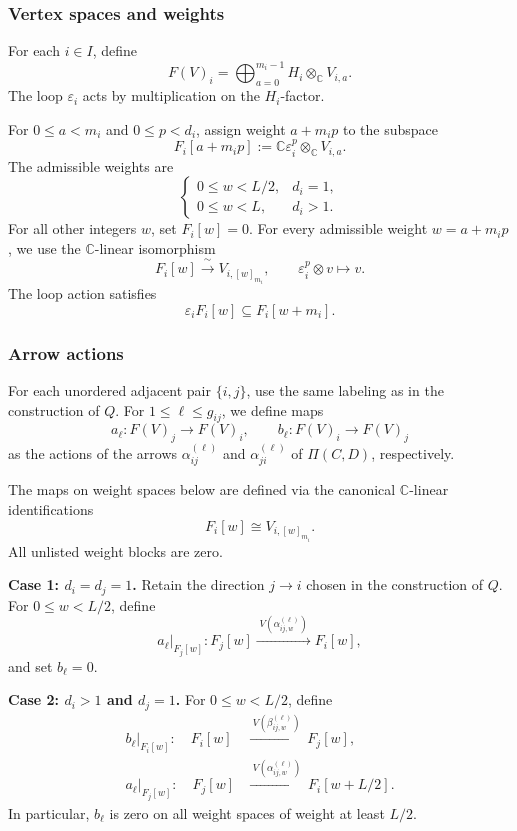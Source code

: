 \documentclass[12pt,reqno]{amsart}
\numberwithin{equation}{section}
\theoremstyle{definition}
\theoremstyle{remark}
\theoremstyle{plain}
\theoremstyle{plain}
\begin{document}
\subsubsection{Vertex spaces and weights}
For each $i\in I$, define
\begin{equation}\label{eq:inj-testvertices}
F(V)_i
=
\bigoplus_{a=0}^{m_i-1}
H_i\otimes_{\mathbb C}V_{i,a}.
\end{equation}
The loop $\varepsilon_i$ acts by multiplication
on the $H_i$-factor.

For $0\le a<m_i$ and $0\le p<d_i$, assign weight $a+m_ip$ to the subspace
\[
    F_i[a+m_ip]
    :=
    \mathbb C\varepsilon_i^p
    \otimes_{\mathbb C}V_{i,a}.
\]
The admissible weights are
\[
    \begin{cases}
        0\le w<L/2, & d_i=1,\\
        0\le w<L,   & d_i>1.
    \end{cases}
\]
For all other integers $w$, set $F_i[w]=0$. For every admissible weight $w=a+m_ip$, we use
the $\mathbb C$-linear isomorphism
\[
    F_i[w]\xrightarrow{\;\sim\;}V_{i,[w]_{m_i}},
    \qquad
    \varepsilon_i^p\otimes v\longmapsto v.
\]
The loop action satisfies
\[
\varepsilon_i F_i[w]
\subseteq F_i[w+m_i].
\]

\subsubsection{Arrow actions}

For each unordered adjacent pair $\{i,j\}$,
use the same labeling as in the construction
of $Q$.
For $1\leq\ell\leq g_{ij}$, we define maps
\[
a_\ell:F(V)_j\longrightarrow F(V)_i,
\qquad
b_\ell:F(V)_i\longrightarrow F(V)_j
\]
as the actions of the arrows
$\alpha_{ij}^{(\ell)}$ and
$\alpha_{ji}^{(\ell)}$ of $\Pi(C,D)$,
respectively.

The maps on weight spaces below are defined via the canonical $\mathbb C$-linear identifications
\[
    F_i[w]\cong V_{i,[w]_{m_i}}.
\]
All unlisted weight blocks are zero.

\par\smallskip
\noindent\textbf{Case 1: $d_i=d_j=1$.}
Retain the direction $j\to i$ chosen in the construction of $Q$.
For $0\leq w<L/2$, define
\[
a_\ell\big|_{F_j[w]}:
F_j[w]
\xrightarrow{\;V(\alpha_{ij,w}^{(\ell)})\;}
F_i[w],
\]
and set $b_\ell=0$.

\par\smallskip
\noindent\textbf{Case 2: $d_i>1$ and $d_j=1$.}
For $0\leq w<L/2$, define
\begin{equation}\label{eq:inj-mixedplacement}
\begin{aligned}
b_\ell\big|_{F_i[w]}:\quad
F_i[w]
&\xrightarrow{\;V(\beta_{ij,w}^{(\ell)})\;}
F_j[w],\\
a_\ell\big|_{F_j[w]}:\quad
F_j[w]
&\xrightarrow{\;V(\alpha_{ij,w}^{(\ell)})\;}
F_i[w+L/2].
\end{aligned}
\end{equation}
In particular, $b_\ell$ is zero on all weight spaces of weight at least $L/2$.
\end{document}
